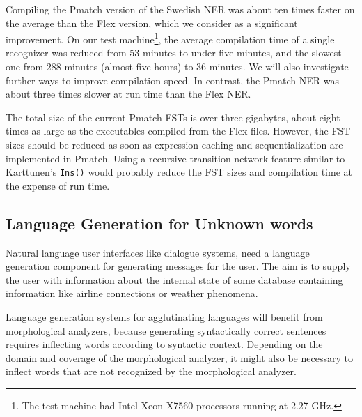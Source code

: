 \documentclass{llncs}
\begin{document}
Compiling the Pmatch version of the Swedish NER was about ten times
faster on the average than the Flex version, which we consider as a
significant improvement. On our test
machine\footnote{The test machine had Intel Xeon X7560 processors
  running at 2.27 GHz.}, the average compilation time of
a single recognizer was reduced from 53 minutes to under five minutes,
and the slowest one from 288 minutes (almost five hours) to 36 minutes.
We will also investigate further
ways to improve compilation speed. In contrast, the Pmatch NER was
about three times slower at run time than the Flex NER.

The total size of the current Pmatch
FSTs is over three gigabytes, about eight times as large as the
executables compiled from the Flex files. However, the FST sizes
should be reduced as soon as expression caching and sequentialization
are implemented in Pmatch. Using a recursive transition network
feature similar to Karttunen's \cite{karttunen/2011} \texttt{Ins()}
would probably reduce the FST sizes and compilation time at the
expense of run time.

\subsection{Language Generation for Unknown words}
\label{sec:morph-generation}
Natural language user interfaces like dialogue systems, need a
language generation component for generating messages for the
user. The aim is to supply the user with information about the
internal state of some database containing information like airline
connections or weather phenomena.

Language generation systems for agglutinating languages will benefit
from morphological analyzers, because generating syntactically correct
sentences requires inflecting words according to syntactic
context. Depending on the domain and coverage of the morphological
analyzer, it might also be necessary to inflect words that are not
recognized by the morphological analyzer. 
\end{document}
